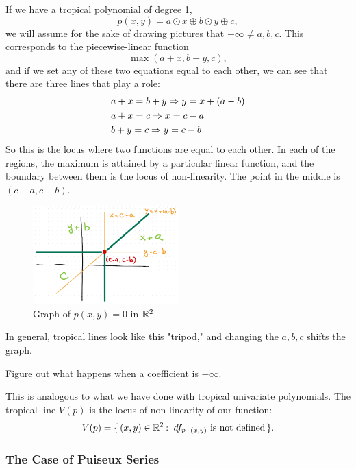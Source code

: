 \documentclass[12pt]{memoir}
\theoremstyle{definition}
\begin{document}
If we have a tropical polynomial of degree 1, 
$$p(x,y)=a\odot x\oplus b\odot y\oplus c,$$
we will assume for the sake of drawing pictures that $-\infty\neq a,b,c$. This corresponds to the piecewise-linear function 
$$\max(a+x,b+y,c),$$
and if we set any of these two equations equal to each other, we can see that there are three lines that play a role:
\begin{align*}
    &a+x=b+y\Rightarrow y=x+(a-b)\\
    &a+x=c\Rightarrow x=c-a\\
    &b+y=c\Rightarrow y=c-b
\end{align*}
So this is the locus where two functions are equal to each other. In each of the regions, the maximum is attained by a particular linear function, and the boundary between them is the locus of non-linearity. The point in the middle is $(c-a,c-b)$. 

\begin{figure}[h!]
    \centering
    \includegraphics[width=0.5\textwidth]{figs/fig7-1-TropicalLineExample.png}
    \caption{Graph of $p(x,y)=0$ in $\mathbb{R}^2$}
    \label{fig:7.1-TropicalLineExample}
\end{figure}

In general, tropical lines look like this "tripod," and changing the $a,b,c$ shifts the graph. 

\begin{Ej}
Figure out what happens when a coefficient is $-\infty$.
\end{Ej}

This is analogous to what we have done with tropical univariate polynomials. The tropical line $V(p)$ is the locus of non-linearity of our function:
$$V(p)=\set{(x,y)\in\bR^2\:\ df_p\!\mid\!_{(x,y)}\text{ is not defined}}.$$

\subsubsection{The Case of Puiseux Series}
\end{document}
